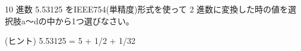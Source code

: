 10 進数 5.53125 をIEEE754(単精度)形式を使って 2 進数に変換した時の値を選択肢a〜dの中から1つ選びなさい。

\medskip
\noindent (ヒント) 5.53125 = 5 + 1/2 + 1/32
